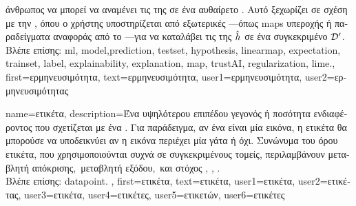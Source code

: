 {{{		άνθρωπος να μπορεί να αναμένει τις}  \foreignlanguage{greek}{της σε ένα αυθαίρετο} 
	 	. \foreignlanguage{greek}{Αυτό ξεχωρίζει σε σχέση με την} , 
		\foreignlanguage{greek}{όπου ο χρήστης υποστηρίζεται από εξωτερικές} —\foreignlanguage{greek}{όπως}  
		\gls{map}s \foreignlanguage{greek}{υπεροχής ή παραδείγματα αναφοράς από το} —\foreignlanguage{greek}{για 
		να καταλάβει τις}  \foreignlanguage{greek}{της $\hat{h}$ σε ένα συγκεκριμένο} 
		 $\mathcal{D}'$. \\ 
	 	\foreignlanguage{greek}{Βλέπε επίσης:} \gls{ml}, \gls{model},\gls{prediction}, \gls{testset}, \gls{hypothesis}, \gls{linearmap}, \gls{expectation}, 
		\gls{trainset}, \gls{label}, \gls{explainability}, \gls{explanation}, \gls{map}, \gls{trustAI}, \gls{regularization}, \gls{lime}.},
	first={\foreignlanguage{greek}{ερμηνευσιμότητα}},
	text={\foreignlanguage{greek}{ερμηνευσιμότητα}},
	user1={\foreignlanguage{greek}{ερμηνευσιμότητα}}, %
	user2={\foreignlanguage{greek}{ερμηνευσιμότητας}} %
}

{name={\foreignlanguage{greek}{ετικέτα}},
	description={\foreignlanguage{greek}{Ένα υψηλότερου επιπέδου γεγονός ή ποσότητα ενδιαφέροντος} 
		\foreignlanguage{greek}{που σχετίζεται με ένα} . \foreignlanguage{greek}{Για παράδειγμα, αν ένα}  
		\foreignlanguage{greek}{είναι μία εικόνα, η ετικέτα θα μπορούσε να υποδεικνύει αν η εικόνα περιέχει μία γάτα ή όχι. 
		Συνώνυμα του όρου ετικέτα, που χρησιμοποι\-ού\-νται συχνά σε συγκεκριμένους τομείς, περιλαμβάνουν 
		\guillemotleft μεταβλητή απόκρισης,\guillemotright\ \guillemotleft μεταβλητή εξόδου,\guillemotright\ και \guillemotleft στόχος\guillemotright} 
		\cite{Gujarati2021}, \cite{Dodge2003}, \cite{Everitt2022}.\\
		\foreignlanguage{greek}{Βλέπε επίσης:} \gls{datapoint}. },
	first={\foreignlanguage{greek}{ετικέτα}},
	text={\foreignlanguage{greek}{ετικέτα}},
	user1={\foreignlanguage{greek}{ετικέτα}}, %
  	user2={\foreignlanguage{greek}{ετικέτας}}, %
	user3={\foreignlanguage{greek}{ετικέτα}}, %
	user4={\foreignlanguage{greek}{ετικέτες}}, %
  	user5={\foreignlanguage{greek}{ετικετών}}, %
	user6={\foreignlanguage{greek}{ετικέτες}} %
}

